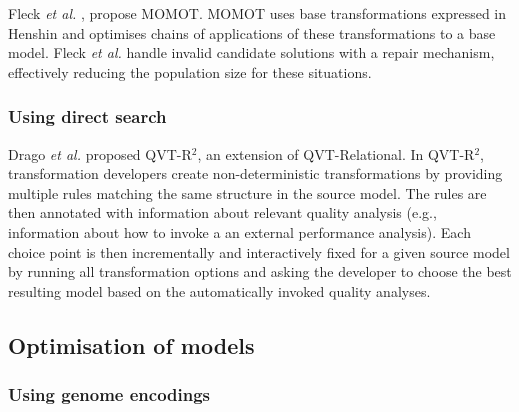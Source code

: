 			Fleck \emph{et al.} \cite{Fleck+15}, propose MOMOT. MOMOT uses base transformations expressed in Henshin and optimises chains of applications of these
			transformations to a base model. Fleck \emph{et al.} handle invalid candidate solutions with a repair mechanism, effectively reducing the population size
			for these situations.
		
		\subsubsection{Using direct search}
		
			Drago \emph{et al.} \cite{Drago+10,Drago+11,Drago+15} proposed QVT-R$^2$, an extension of QVT-Relational. In QVT-R$^2$, transformation developers create 
			non-deterministic transformations by providing multiple rules matching the same structure in the source model. The rules are then annotated with information
			about relevant quality analysis (e.g., information about how to invoke a an external performance analysis). Each choice point is then incrementally and
			interactively fixed for a given source model by running all transformation options and asking the developer to choose the best resulting model based on the
			automatically invoked quality analyses.

	\subsection{Optimisation of models}
	
	  \subsubsection{Using genome encodings}
		
			
